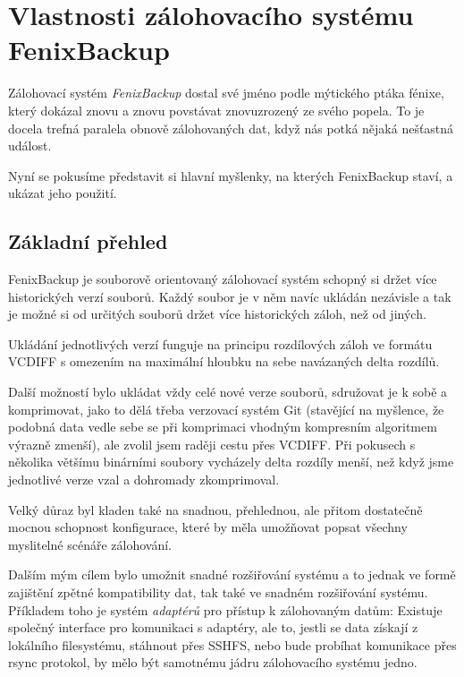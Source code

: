 \chapter{Vlastnosti zálohovacího systému FenixBackup}

Zálohovací systém {\it FenixBackup} dostal své jméno podle mýtického ptáka
fénixe, který dokázal znovu a znovu povstávat znovuzrozený ze svého popela. To
je docela trefná paralela obnově zálohovaných dat, když nás potká nějaká
nešťastná událost.

Nyní se pokusíme představit si hlavní myšlenky, na kterých FenixBackup staví,
a ukázat jeho použití.

\section{Základní přehled}

FenixBackup je souborově orientovaný zálohovací systém schopný si držet více
historických verzí souborů. Každý soubor je v něm navíc ukládán nezávisle a tak
je možné si od určitých souborů držet více historických záloh, než od jiných.

Ukládání jednotlivých verzí funguje na principu rozdílových záloh ve formátu
\gls{VCDIFF} s omezením na maximální hloubku na sebe navázaných delta rozdílů.

Další možností bylo ukládat vždy celé nové verze souborů, sdružovat je k sobě
a komprimovat, jako to dělá třeba verzovací systém Git (stavějící na myšlence,
že podobná data vedle sebe se při komprimaci vhodným kompresním algoritmem
výrazně zmenší), ale zvolil jsem raději cestu přes \gls{VCDIFF}. Při pokusech
s několika většímu binárními soubory vycházely delta rozdíly menší, než když
jsme jednotlivé verze vzal a dohromady zkomprimoval.

Velký důraz byl kladen také na snadnou, přehlednou, ale přitom dostatečně mocnou
schopnost konfigurace, které by měla umožňovat popsat všechny myslitelné
scénáře zálohování.


Dalším mým cílem bylo umožnit snadné rozšiřování systému a to jednak ve formě
zajištění zpětné kompatibility dat, tak také ve snadném rozšiřování systému.
Příkladem toho je systém {\it adaptérů} pro přístup k zálohovaným datům:
Existuje společný interface pro komunikaci s adaptéry, ale to, jestli se data
získají z lokálního filesystému, stáhnout přes \gls{SSHFS}, nebo bude probíhat
komunikace přes rsync protokol, by mělo být samotnému jádru zálohovacího
systému jedno.


